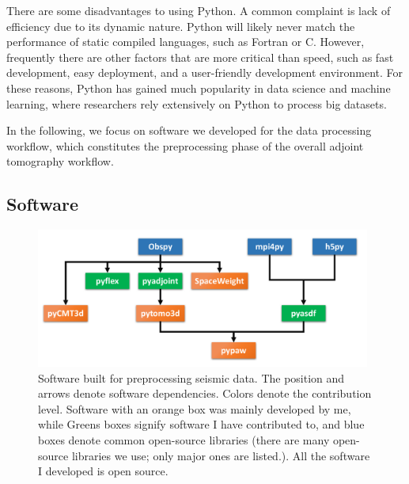 There are some disadvantages to using Python.
A common complaint is lack of efficiency due to its dynamic nature.
Python will likely never match the performance of static compiled languages,
such as Fortran or C.
However,
frequently there are other factors that are more critical than speed,
such as fast development, easy deployment, and a user-friendly development environment.
For these reasons, Python has gained much popularity in data science and machine learning, where researchers rely extensively on Python to process big datasets.

In the following, we focus on software we developed
for the data processing workflow, which constitutes the preprocessing phase of the overall adjoint tomography workflow.

\subsection{Software}

\begin{figure}
  \centering
  \includegraphics[width=0.98\textwidth]{ch-tools/figures/data_processing_software.pdf}
  \caption[software built for preprocessing seismic data]
  {\small{Software built for preprocessing seismic data. The position and arrows denote software dependencies. Colors denote the contribution level. Software with
  an orange box was mainly developed by me, while Greens boxes signify software I have contributed to, and blue boxes denote common open-source libraries (there are many open-source libraries we use; only major ones are listed.). All the software I developed is open source.}}
  \label{fig:preprocess_software}
\end{figure}


